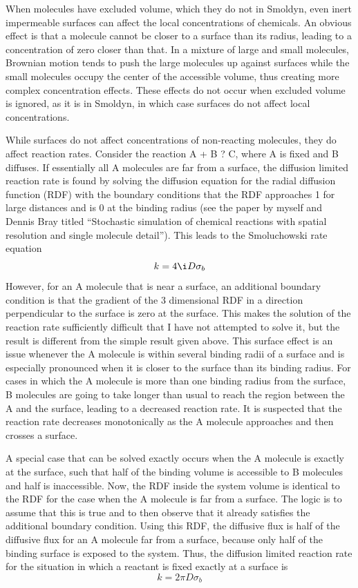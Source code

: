 \documentclass {scrbook}
\begin{document}
When molecules have excluded volume, which they do not in Smoldyn, even inert impermeable surfaces can affect the local concentrations of chemicals. An obvious effect is that a molecule cannot be closer to a surface than its radius, leading to a concentration of zero closer than that. In a mixture of large and small molecules, Brownian motion tends to push the large molecules up against surfaces while the small molecules occupy the center of the accessible volume, thus creating more complex concentration effects. These effects do not occur when excluded volume is ignored, as it is in Smoldyn, in which case surfaces do not affect local concentrations.

While surfaces do not affect concentrations of non-reacting molecules, they do affect reaction rates. Consider the reaction A + B ? C, where A is fixed and B diffuses. If essentially all A molecules are far from a surface, the diffusion limited reaction rate is found by solving the diffusion equation for the radial diffusion function (RDF) with the boundary conditions that the RDF approaches 1 for large distances and is 0 at the binding radius (see the paper by myself and Dennis Bray titled ``Stochastic simulation of chemical reactions with spatial resolution and single molecule detail''). This leads to the Smoluchowski rate equation
$$k=4 \i D \sigma_b$$
However, for an A molecule that is near a surface, an additional boundary condition is that the gradient of the 3 dimensional RDF in a direction perpendicular to the surface is zero at the surface. This makes the solution of the reaction rate sufficiently difficult that I have not attempted to solve it, but the result is different from the simple result given above. This surface effect is an issue whenever the A molecule is within several binding radii of a surface and is especially pronounced when it is closer to the surface than its binding radius. For cases in which the A molecule is more than one binding radius from the surface, B molecules are going to take longer than usual to reach the region between the A and the surface, leading to a decreased reaction rate. It is suspected that the reaction rate decreases monotonically as the A molecule approaches and then crosses a surface.

A special case that can be solved exactly occurs when the A molecule is exactly at the surface, such that half of the binding volume is accessible to B molecules and half is inaccessible. Now, the RDF inside the system volume is identical to the RDF for the case when the A molecule is far from a surface. The logic is to assume that this is true and to then observe that it already satisfies the additional boundary condition. Using this RDF, the diffusive flux is half of the diffusive flux for an A molecule far from a surface, because only half of the binding surface is exposed to the system. Thus, the diffusion limited reaction rate for the situation in which a reactant is fixed exactly at a surface is
$$k = 2 \pi D \sigma_b$$
\end{document}
